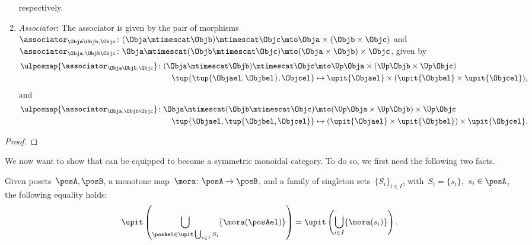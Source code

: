 \begin{lemma}
\begin{enumerate}
    respectively.
    \item \emph{Associator}: The associator is given by the pair of morphisms~$\associator_{\Obja\Objb,\Objc}\colon (\Obja\mtimescat \Objb)\mtimescat \Objc \mto \Obja\times ( \Objb \times \Objc)$ and~$\associator_{\Obja,\Objb\Objc}\colon \Obja\mtimescat (\Objb\mtimescat \Objc) \mto (\Obja\times \Objb) \times \Objc$, given by
    \begin{equation}
        \begin{aligned}
            \ulposmap{\associator_{\Obja\Objb,\Objc}}\colon (\Obja\mtimescat \Objb)\mtimescat \Objc &\mto \Up \Obja\times (\Up \Objb \times \Up \Objc)\\
            \tup{\tup{\Objael,\Objbel},\Objcel}&\mapsto \upit\{\Objael\}\times (\upit\{\Objbel\}\times \upit\{\Objcel\}),
        \end{aligned}
    \end{equation}
    and
    \begin{equation}
        \begin{aligned}
            \ulposmap{\associator_{\Obja,\Objb\Objc}}\colon \Obja\mtimescat (\Objb\mtimescat \Objc) &\mto (\Up \Obja\times \Up \Objb) \times \Up \Objc\\
            \tup{\Objael,\tup{\Objbel,\Objcel}}&\mapsto (\upit\{\Objael\}\times \upit\{\Objbel\})\times \upit\{\Objcel\}.
        \end{aligned}
    \end{equation}
\end{enumerate}
\end{lemma}
\begin{proof}
\end{proof}


We now want to show that \UPos can be equipped to become a symmetric monoidal category.
To do so, we first need the following two facts.

\begin{lemma}
  \label{lem:unpack_u_functor}
  Given posets~$\posA,\posB$, a monotone map~$\mora \colon \posA \to \posB$, and a family of singleton sets~$\{S_i\}_{i\in I}$, with~$S_i=\{s_i\}$,~$s_i\in \posA$, the following equality holds:
  \begin{equation}
    \label{eq:lemma_unpack}
    \upit \left( \bigcup_{\posAel \in \upit \bigcup_{i\in I}S_i}\{\mora(\posAel)\}\right)= \upit \left( \bigcup_{i\in I} \{\mora(s_i)\}\right).
  \end{equation}
\end{lemma}

